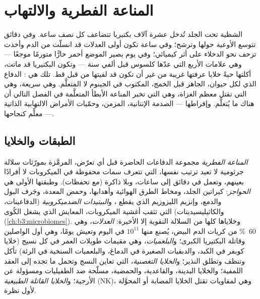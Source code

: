 \chapter{المناعة الفطرية والالتهاب}\label{ch:b3:innate-immunity}

الشظية تحت الجلد تُدخل عشرة آلاف بكتيريا تتضاعف كل نصف
ساعة. وفي دقائق تتوسع الأوعية حولها وترشح؛ وفي ساعة تكون
أولى العدلات قد انسلّت من الدم وأخذت تزحف نحو الدخلاء على
أثر كيميائي؛ وفي يوم يصير الموضع أحمر حارًّا متورمًا موجعًا
--- وهي علامات  الأربع التي عدّها كلسوس قبل ألفي
سنة --- وتكون البكتيريا قد ماتت، أكلتها حيةً خلايا عرفتها
غريبة من غير أن تكون قد لقيتها من قبل قط. تلك هي : الدفاع الذي لكل حيوان، الجاهز قبل الخمج، المكتوب
في الجينوم لا المتعلَّم. وهي سريعة، وهي التي تقتل معظم
الغزاة، وهي التي تخبر المناعة الأبطأ المتعلَّمة في الفصل
التالي أن هناك ما يُتعلَّم. وإفراطها --- الصدمة الإنتانية،
 المزمن، وحمّيات الأمراض الالتهابية الذاتية ---
معلِّم كنجاحها.

\section{الطبقات والخلايا}

\begin{definition}\label{def:b3:innate-immunity:innate}
\emph{المناعة الفطرية} مجموعة الدفاعات الحاضرة قبل أي
تعرّض، المرمَّزة بمورّثات سلالة جرثومية لا تعيد ترتيب
نفسها، التي تتعرف سمات محفوظة في الميكروبات لا أفرادًا
بعينهم، وتعمل في دقائق إلى ساعات، وبلا ذاكرة (مع تحفظات).
وطبقتها الأولى هي \emph{الحواجز}: كيراتين الجلد، ومخاط
الطرق الهوائية وأهدابها، وحمض المعدة، وجَرف البول والدمع،
وإنزيم الليزوزيم الذي يقطع ،
و\emph{الببتيدات الضدميكروبية} (الدفاعينات،
والكاثيليسيدينات) التي تثقب أغشية الميكروبات، 
المعايش الذي يشغل الكُوى (\cref{ch:b3:microbiomes}).
وخلاياها كلها من السلالة النقوية إلا الأخيرة:
\emph{العدلات}، وهي \qty{60}{\%} من كريات الدم البيض، يُصنع
منها $10^{11}$ في اليوم وتعيش يومًا، وهي أول الواصلين وقاتلة
البكتيريا الكبرى؛ و\emph{البلعميات}، وهي مقيمات طويلات
العمر في كل نسيج (خلايا كوبفر في الكبد، والدبقيات الصغيرة
في الدماغ، والبلعميات السنخية في الرئة) تأكل وتنظف وتطلق
النذير؛ و\emph{الخلايا التغصنية}، التي تعاين النسج وتحمل ما
تجده إلى العقد اللمفية؛ والخلايا البدينة، والقاعدية،
والحمضية، مسلّحة ضد الطفيليات ومسؤولة عن الأرجية؛
و\emph{الخلايا القاتلة الطبيعية} (NK)، وهي لمفاويات تقتل
الخلايا المصابة أو المحوَّلة لأول نظرة.
\end{definition}

